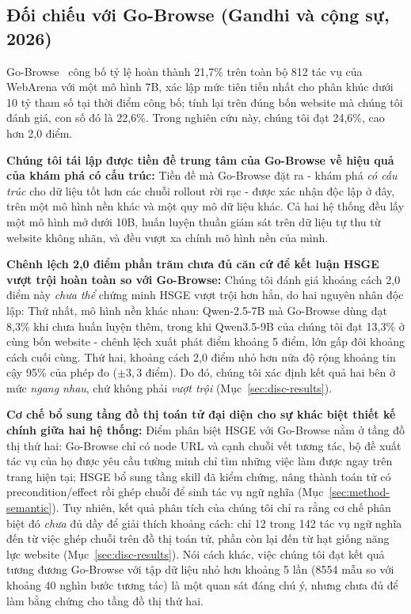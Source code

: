 \subsection{Đối chiếu với Go-Browse (Gandhi và cộng sự, 2026)}

Go-Browse~\cite{gandhi2026gobrowse} công bố tỷ lệ hoàn thành 21{,}7\% trên toàn bộ 812 tác vụ của WebArena với một mô hình 7B, xác lập mức tiên tiến nhất cho phân khúc dưới 10 tỷ tham số tại thời điểm công bố; tính lại trên đúng bốn website mà chúng tôi đánh giá, con số đó là 22{,}6\%. Trong nghiên cứu này, chúng tôi đạt 24{,}6\%, cao hơn 2{,}0 điểm.

\textbf{Chúng tôi tái lập được tiền đề trung tâm của Go-Browse về hiệu quả của khám phá có cấu trúc:} Tiền đề mà Go-Browse đặt ra - khám phá \emph{có cấu trúc} cho dữ liệu tốt hơn các chuỗi rollout rời rạc - được xác nhận độc lập ở đây, trên một mô hình nền khác và một quy mô dữ liệu khác. Cả hai hệ thống đều lấy một mô hình mở dưới 10B, huấn luyện thuần giám sát trên dữ liệu tự thu từ website không nhãn, và đều vượt xa chính mô hình nền của mình.

\textbf{Chênh lệch 2{,}0 điểm phần trăm chưa đủ căn cứ để kết luận HSGE vượt trội hoàn toàn so với Go-Browse:} Chúng tôi đánh giá khoảng cách 2{,}0 điểm này \emph{chưa thể} chứng minh HSGE vượt trội hơn hẳn, do hai nguyên nhân độc lập: Thứ nhất, mô hình nền khác nhau: Qwen-2.5-7B mà Go-Browse dùng đạt 8{,}3\% khi chưa huấn luyện thêm, trong khi Qwen3.5-9B của chúng tôi đạt 13{,}3\% ở cùng bốn website - chênh lệch xuất phát điểm khoảng 5 điểm, lớn gấp đôi khoảng cách cuối cùng. Thứ hai, khoảng cách 2{,}0 điểm nhỏ hơn nửa độ rộng khoảng tin cậy 95\% của phép đo ($\pm 3{,}3$ điểm). Do đó, chúng tôi xác định kết quả hai bên ở mức \emph{ngang nhau}, chứ không phải \emph{vượt trội} (Mục~\ref{sec:disc-results}).

\textbf{Cơ chế bổ sung tầng đồ thị toán tử đại diện cho sự khác biệt thiết kế chính giữa hai hệ thống:} Điểm phân biệt HSGE với Go-Browse nằm ở tầng đồ thị thứ hai: Go-Browse chỉ có node URL và cạnh chuỗi vết tương tác, bộ đề xuất tác vụ của họ được yêu cầu tường minh chỉ tìm những việc làm được ngay trên trang hiện tại; HSGE bổ sung tầng skill đã kiểm chứng, nâng thành toán tử có precondition/effect rồi ghép chuỗi để sinh tác vụ ngữ nghĩa (Mục~\ref{sec:method-semantic}). Tuy nhiên, kết quả phân tích của chúng tôi chỉ ra rằng cơ chế phân biệt đó \emph{chưa} đủ dầy để giải thích khoảng cách: chỉ 12 trong 142 tác vụ ngữ nghĩa đến từ việc ghép chuỗi trên đồ thị toán tử, phần còn lại đến từ hạt giống năng lực website (Mục~\ref{sec:disc-results}). Nói cách khác, việc chúng tôi đạt kết quả tương đương Go-Browse với tập dữ liệu nhỏ hơn khoảng 5 lần (8554 mẫu so với khoảng 40 nghìn bước tương tác) là một quan sát đáng chú ý, nhưng chưa đủ để làm bằng chứng cho tầng đồ thị thứ hai.

